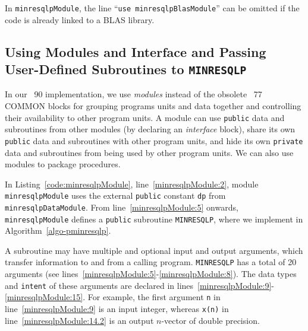 \documentclass{doc_acmtrans2m}
\begin{document}
In \texttt{minresqlpModule}, the line ``\texttt{use
  minresqlpBlasModule}'' can be omitted if the code is already linked
to a BLAS library.


\subsection{Using Modules and Interface and Passing User-Defined
            Subroutines to \texttt{MINRESQLP}}

In our \FORTRAN~90 implementation, we use \emph{modules} instead of
the obsolete \FORTRAN~77 COMMON blocks for grouping programs units and
data together and controlling their availability to other program
units. A module can use \texttt{public} data and subroutines from
other modules (by declaring an \emph{interface} block), share its own
\texttt{public} data and subroutines with other program units, and
hide its own \texttt{private} data and subroutines from being used by
other program units. We can also use modules to package procedures.

In Listing~\ref{code:minresqlpModule}, line~\ref{minresqlpModule:2},
module \texttt{minresqlpModule} uses the external \texttt{public}
constant \texttt{dp} from \texttt{minresqlpDataModule}. From
line~\ref{minresqlpModule:5} onwards, \texttt{minresqlpModule} defines
a \texttt{public} subroutine \texttt{MINRESQLP}, where we implement
\MINRESQLP{} in Algorithm~\ref{algo-pminresqlp}.

A \FORTRAN subroutine may have multiple and optional input and output
arguments, which transfer information to and from a calling program.
\texttt{MINRESQLP} has a total of 20 arguments (see
lines~\ref{minresqlpModule:5}-\ref{minresqlpModule:8}). The data types
and \texttt{intent} of these arguments are declared in
lines~\ref{minresqlpModule:9}-\ref{minresqlpModule:15}. For example,
the first argument \texttt{n} in line~\ref{minresqlpModule:9} is an
input integer, whereas \texttt{x(n)} in
line~\ref{minresqlpModule:14.2} is an output $n$-vector of double
precision.
\end{document}
